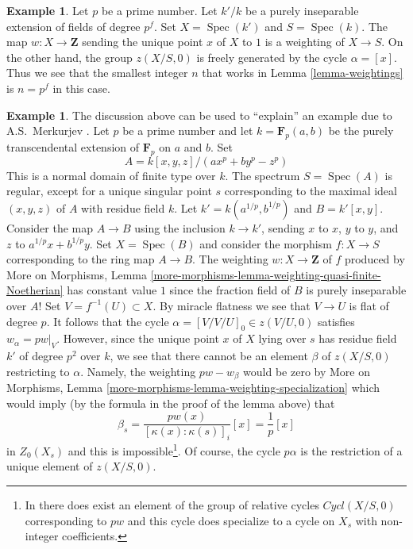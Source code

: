 \documentclass{stacks-project}
\theoremstyle{plain}
\theoremstyle{definition}
\newtheorem{example}[subsection]{Example}
\theoremstyle{remark}
\numberwithin{equation}{subsection}
\def\Spec{\mathop{\mathrm{Spec}}}
\begin{document}
\begin{example}
\label{example-n-must-be-positive-sometimes}
Let $p$ be a prime number. Let $k'/k$ be a purely inseparable extension
of fields of degree $p^f$. Set $X = \Spec(k')$ and $S = \Spec(k)$.
The map $w : X \to \mathbf{Z}$ sending the unique point $x$ of $X$ to $1$
is a weighting of $X \to S$. On the other hand,
the group $z(X/S, 0)$ is freely generated by the cycle $\alpha = [x]$.
Thus we see that the smallest integer $n$ that works in
Lemma \ref{lemma-weightings} is $n = p^f$ in this case.
\end{example}

\begin{example}
\label{example-Merkurjev}
The discussion above can be used to ``explain'' an example due to
A.S.~Merkurjev \cite[Example 3.5.10]{SV}. Let $p$ be a prime number
and let $k = \mathbf{F}_p(a, b)$ be the purely transcendental extension
of $\mathbf{F}_p$ on $a$ and $b$. Set
$$
A = k[x, y, z]/(a x^p + b y^p - z^p)
$$
This is a normal domain of finite type over $k$. The spectrum
$S = \Spec(A)$ is regular, except for a unique singular point $s$
corresponding to the maximal ideal $(x, y, z)$ of $A$ with residue field $k$.
Let $k' = k(a^{1/p}, b^{1/p})$ and $B = k'[x, y]$. Consider the map
$A \to B$ using the inclusion $k \to k'$, sending $x$ to $x$, $y$ to $y$,
and $z$ to $a^{1/p}x + b^{1/p}y$. Set $X = \Spec(B)$ and consider the morphism
$f : X \to S$ corresponding to the ring map $A \to B$.
The weighting $w : X \to \mathbf{Z}$ of $f$
produced by More on Morphisms, Lemma
\ref{more-morphisms-lemma-weighting-quasi-finite-Noetherian}
has constant value $1$ since the fraction field of $B$ is purely inseparable
over $A$!
Set $V = f^{-1}(U) \subset X$. By miracle flatness we see that
$V \to U$ is flat of degree $p$. It follows that the cycle
$\alpha = [V/V/U]_0 \in z(V/U, 0)$ satisfies $w_\alpha = pw|_V$.
However, since the unique point $x$ of $X$ lying over $s$
has residue field $k'$ of degree $p^2$ over $k$, we see that
there cannot be an element $\beta$ of $z(X/S, 0)$ restricting to $\alpha$.
Namely, the weighting $pw - w_\beta$ would be zero by More on Morphisms,
Lemma \ref{more-morphisms-lemma-weighting-specialization} which
would imply (by the formula in the proof of the lemma above) that
$$
\beta_s = \frac{pw(x)}{[\kappa(x) : \kappa(s)]_i} [x] =
\frac{1}{p}[x]
$$
in $Z_0(X_s)$ and this is impossible\footnote{In \cite{SV} there does
exist an element of the group of relative cycles $Cycl(X/S, 0)$
corresponding to $pw$ and this cycle does specialize to a cycle
on $X_s$ with non-integer coefficients.}. Of course, 
the cycle $p\alpha$ is the restriction of a unique element of
$z(X/S, 0)$.
\end{example}
\end{document}
